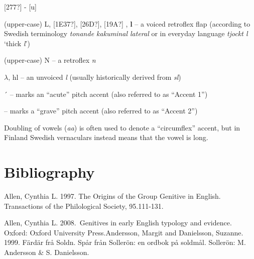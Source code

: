 [277?] - [u]


(upper-case) L, [1E37?], [26D?], [19A?] , \textbf{l }– a voiced retroflex flap (according to Swedish terminology \textit{tonande kakuminal lateral} or in everyday language \textit{tjockt l} ‘thick \textit{l}’)

(upper-case) N – a retroflex \textit{n}

$\lambda $, hl – an unvoiced \textit{l } (usually historically derived from \textit{sl})

´  – marks an “acute” pitch accent (also referred to as “Accent 1”)


{\textasciigrave} – marks a “grave” pitch accent (also referred to as “Accent 2”)


Doubling of vowels (\textit{aa}) is often used to denote a “circumflex” accent, but in Finland Swedish vernaculars instead means that the vowel is long.

\section[Bibliography]{\rmfamily Bibliography}
Allen, Cynthia L. 1997. The Origins of the {\textquotesingle}Group Genitive{\textquotesingle} in English. Transactions of the Philological Society, 95.111-131.


Allen, Cynthia L. 2008.~Genitives in early English typology and evidence. Oxford: Oxford University Press.Andersson, Margit and Danielsson, Suzanne. 1999. Färdär frå Soldn. Spår från Sollerön: en ordbok på soldmål. Sollerön: M. Andersson \& S. Danielsson.


